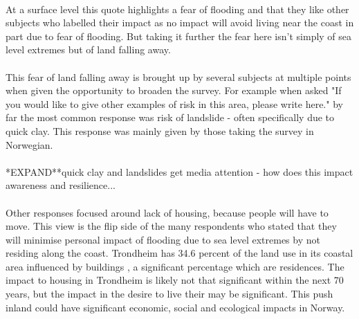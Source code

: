 \paragraph{}

At a surface level this quote highlights a fear of flooding and that they like other subjects who labelled their impact as no impact will avoid living near the coast in part due to fear of flooding. But taking it further the fear here isn't simply of sea level extremes but of land falling away. 
\paragraph{}

This fear of land falling away is brought up by several subjects at multiple points when given the opportunity to broaden the survey. For example when asked "If you would like to give other examples of risk in this area, please write here." by far the most common response was risk of landslide - often specifically due to quick clay. This response was mainly given by those taking the survey in Norwegian. 
\paragraph{}
*EXPAND**quick clay and landslides get media attention - how does this impact awareness and resilience...
\paragraph{}

Other responses focused around lack of housing, because people will have to move. This view is the flip side of the many respondents who stated that they will minimise personal impact of flooding due to sea level extremes by not residing along the coast. 
Trondheim has 34.6 percent of the land use in its coastal area influenced by buildings \cite{engebakken_construction_2022}, a significant percentage which are residences. The impact to housing in Trondheim is likely not that significant within the next 70 years, but the impact in the desire to live their may be significant. This push inland could have significant economic, social and ecological impacts in Norway. 
\paragraph{}



